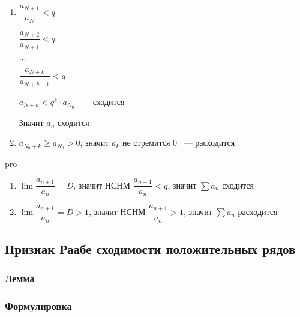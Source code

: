 \documentclass[../main.tex]{subfiles}
\begin{document}
            \begin{enumerate}
            
                \item 
                
                    $\dfrac{a_{N + 1}}{a_N} < q$
                    
                    $\dfrac{a_{N + 2}}{a_{N + 1}} < q$
                    
                    $\ldots$
                    
                    $\dfrac{a_{N + k}}{a_{N + k - 1}} < q$
                    
                    $a_{N + k} < q^k \cdot a_{N_0}$ ~--- сходится
                    
                    Значит $a_n$ сходится
                    
                \item
                
                    $a_{N_0 + k} \geq a_{N_0} > 0$, значит $a_k$ не стремится $0$ ~--- расходится
                
            \end{enumerate}
            
            \underline{pro}
            
            \begin{enumerate}
            
                \item $\lim \dfrac{a_{n + 1}}{a_n} = D$, значит НСНМ $\dfrac{a_{n + 1}}{a_n} < q$, значит $\sum a_n$ сходится
                
                \item $\lim \dfrac{a_{n + 1}}{a_n} = D > 1$, значит НСНМ $\dfrac{a_{n + 1}}{a_n} > 1$, значит $\sum a_n$ расходится
                
            \end{enumerate}
\newpage


\subsection{Признак Раабе сходимости положительных рядов}
\subsubsection*{Лемма}
        
            \subsubsection*{Формулировка}
            
\end{document}
